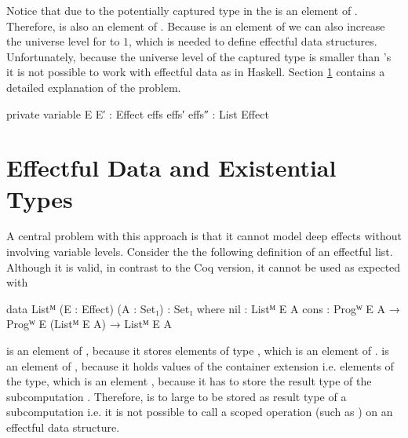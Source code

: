 Notice that due to the potentially captured type in the  is an
element of .
Therefore,  is also an element of .
Because  is an element of  we can also
increase the universe level for  to $1$, which is needed to
define effectful data structures.
Unfortunately, because the universe level of the captured type is smaller than
's it is not possible to work with effectful data as in
Haskell.
Section \ref{higher-order:eff-data-ext-types} contains a detailed explanation of
the problem.

\begin{code}[hide]
private
  variable
    E E′ : Effect
    effs effs′ effs″ : List Effect
\end{code}

\section{Effectful Data and Existential Types}
\label{higher-order:eff-data-ext-types}

A central problem with this approach is that it cannot model deep effects
without involving variable levels.
Consider the the following definition of an effectful list.
Although it is valid, in contrast to the Coq version, it cannot be used as
expected with 

\begin{code}
data Listᴹ (E : Effect) (A : Set₁) : Set₁ where
  nil   : Listᴹ E A
  cons  : Progᵂ E A → Progᵂ E (Listᴹ E A) → Listᴹ E A
\end{code}
\AgdaSpace{}\AgdaSpace{} is
an element of , because it stores elements of type
\AgdaSpace{}\AgdaSpace{},
which is an element of .
\AgdaSpace{}\AgdaSpace{} is
an element of , because it holds values of the container
extension i.e. elements of the  type, which is an element
, because it has to store the result type of the
subcomputation .
Therefore,
\AgdaSpace{}\AgdaSpace{} is
to large to be stored as result type of a subcomputation i.e. it is not possible
to call a scoped operation (such as ) on an effectful data
structure.

